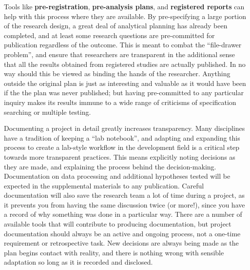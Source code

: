 Tools like \textbf{pre-registration},
\textbf{pre-analysis plans},
and \textbf{registered reports}
can help with this process where they are available.
By pre-specifying a large portion of the research design,
a great deal of analytical planning has already been completed,
and at least some research questions are pre-committed for publication regardless of the outcome.
This is meant to combat the ``file-drawer problem'',\cite{simonsohn2014p}
and ensure that researchers are transparent in the additional sense that
all the results obtained from registered studies are actually published.
In no way should this be viewed as binding the hands of the researcher.\cite{olken2015promises}
Anything outside the original plan is just as interesting and valuable
as it would have been if the the plan was never published;
but having pre-committed to any particular inquiry makes its results
immune to a wide range of criticisms of specification searching or multiple testing.

Documenting a project in detail greatly increases transparency.
Many disciplines have a tradition of keeping a ``lab notebook'',
and adapting and expanding this process to create a
lab-style workflow in the development field is a
critical step towards more transparent practices.
This means explicitly noting decisions as they are made,
and explaining the process behind the decision-making.
Documentation on data processing and additional hypotheses tested
will be expected in the supplemental materials to any publication.
Careful documentation will also save the research team a lot of time during a project,
as it prevents you from having the same discussion twice (or more!),
since you have a record of why something was done in a particular way.
There are a number of available tools
that will contribute to producing documentation,
but project documentation should always be an active and ongoing process,
not a one-time requirement or retrospective task.
New decisions are always being made as the plan begins contact with reality,
and there is nothing wrong with sensible adaptation so long as it is recorded and disclosed.

